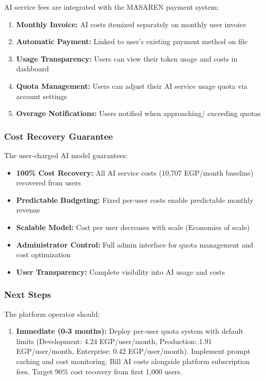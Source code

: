 \documentclass[11pt,a4paper]{article}
\begin{document}
\begin{enumerate}
AI service fees are integrated with the MASAREN payment system:

\begin{enumerate}
    \item \textbf{Monthly Invoice:} AI costs itemized separately on monthly user invoice
    \item \textbf{Automatic Payment:} Linked to user's existing payment method on file
    \item \textbf{Usage Transparency:} Users can view their token usage and costs in dashboard
    \item \textbf{Quota Management:} Users can adjust their AI service usage quota via account settings
    \item \textbf{Overage Notifications:} Users notified when approaching/ exceeding quotas
\end{enumerate}

\subsubsection{Cost Recovery Guarantee}

The user-charged AI model guarantees:

\begin{itemize}
    \item \textbf{100\% Cost Recovery:} All AI service costs (10,707 EGP/month baseline) recovered from users
    \item \textbf{Predictable Budgeting:} Fixed per-user costs enable predictable monthly revenue
    \item \textbf{Scalable Model:} Cost per user decreases with scale (Economies of scale)
    \item \textbf{Administrator Control:} Full admin interface for quota management and cost optimization
    \item \textbf{User Transparency:} Complete visibility into AI usage and costs
\end{itemize}

\subsubsection{Next Steps}

The platform operator should:

\begin{enumerate}
    \item \textbf{Immediate (0-3 months):} Deploy per-user quota system with default limits (Development: 4.24 EGP/user/month, Production: 1.91 EGP/user/month, Enterprise: 0.42 EGP/user/month). Implement prompt caching and cost monitoring. Bill AI costs alongside platform subscription fees. Target 90\% cost recovery from first 1,000 users.
    

\end{enumerate}
\end{enumerate}
\end{document}
